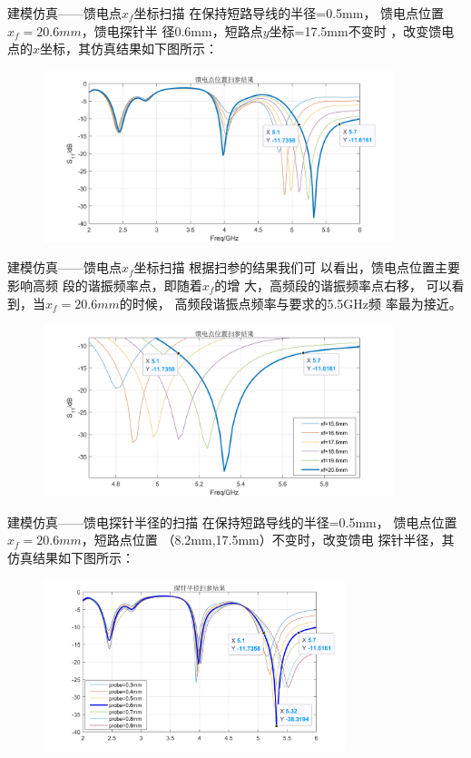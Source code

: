 \documentclass[10pt]{beamer}
\begin{document}
\begin{frame}{建模仿真——{\normalsize 馈电点$x_f$坐标扫描}}
	\qquad 在保持短路导线的半径=0.5mm，
	馈电点位置$x_f=20.6mm$，馈电探针半
	径0.6mm，短路点$y$坐标=17.5mm不变时
	，改变馈电点的$x$坐标，其仿真结果如下图所示：
    \begin{figure}[htbp]
		\centering
		\includegraphics[height=5cm]{figs/feed_p1.jpg}
	\end{figure}
\end{frame}

\begin{frame}{建模仿真——{\normalsize 馈电点$x_f$坐标扫描}}
	\qquad 根据扫参的结果我们可
	以看出，馈电点位置主要影响高频
	段的谐振频率点，即随着$x_f$的增
	大，高频段的谐振频率点右移，
	可以看到，当$x_f=20.6mm$的时候，
	高频段谐振点频率与要求的5.5GHz频
	率最为接近。
	\begin{figure}[htbp]
		\centering
		\includegraphics[height=5cm]{figs/feed_p2.jpg}
	\end{figure}
\end{frame}


\begin{frame}{建模仿真——{\normalsize 馈电探针半径的扫描}}
	\qquad 在保持短路导线的半径=0.5mm，
	馈电点位置$x_f=20.6mm$，短路点位置
	（8.2mm,17.5mm）不变时，改变馈电
	探针半径，其仿真结果如下图所示：
	\begin{figure}[htbp]
		\centering
		\includegraphics[height=5cm]{figs/probe1.jpg}
	\end{figure}
\end{frame}
\end{document}
